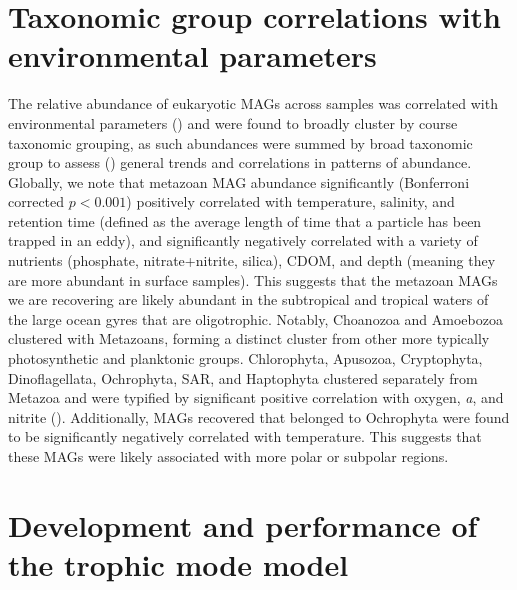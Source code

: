 \documentclass[12pt]{article}
\numberwithin{equation}{section}
\begin{document}

\section{Taxonomic group correlations with environmental parameters}
The relative abundance of eukaryotic MAGs across samples was correlated with environmental parameters () and were found to broadly cluster by course taxonomic grouping, as such abundances were summed by broad taxonomic group to assess () general trends and correlations in patterns of abundance. Globally, we note that metazoan MAG abundance significantly (Bonferroni corrected $p<0.001$) positively correlated with temperature, salinity, and retention time (defined as the average length of time that a particle has been trapped in an eddy), and significantly negatively correlated with a variety of nutrients (phosphate, nitrate+nitrite, silica), CDOM, and depth (meaning they are more abundant in surface samples). This suggests that the metazoan MAGs we are recovering are likely abundant in the subtropical and tropical waters of the large ocean gyres that are oligotrophic. Notably, Choanozoa and Amoebozoa clustered with Metazoans, forming a distinct cluster from other more typically photosynthetic and planktonic groups. Chlorophyta, Apusozoa, Cryptophyta, Dinoflagellata, Ochrophyta, SAR, and Haptophyta clustered separately from Metazoa and were typified by significant positive correlation with oxygen, \textit{a}, and nitrite (). Additionally, MAGs recovered that belonged to Ochrophyta were found to be significantly negatively correlated with temperature. This suggests that these MAGs were likely associated with more polar or subpolar regions.

\section{Development and performance of the trophic mode model}
\end{document}
